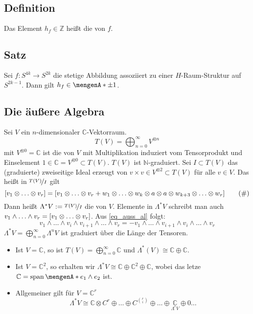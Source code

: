 \subsection{Definition} %
\label{sub:46}
Das Element $h_f \in \mathds{Z}$ heißt die  von $f$.

\subsection{Satz} %
\label{sub:47}
Sei $f\colon S^{4k} \to S^{2k}$ die stetige Abbildung assoziiert zu einer $H$-Raum-Struktur auf $S^{2k-1}$. Dann gilt $h_f \in \set{\pm 1}$.



\subsection*{Die äußere Algebra}
Sei $V$ ein $n$-dimensionaler $\mathds{C}$-Vektorraum.
\[
	T(V) = \bigoplus_{n=0}^\infty V^{\otimes n}
\]
mit $V^{\otimes 0}=\mathds{C}$ ist die  von $V$ mit Multiplikation induziert vom Tensorprodukt und Einselement 
$1\in \mathds{C}=V^{\otimes 0} \subset T(V)$. $T(V)$ ist $\mathds{N}$-graduiert. Sei $I \subset T(V)$ das (graduierte) zweiseitige Ideal erzeugt von 
$v \times v \in V^{\otimes 2} \subset T(V)$ für alle $v \in V$. Das heißt in $\nicefrac{T(V)}{I}$ gilt
\begin{equation*}
	\benbrace*{v_1 \otimes \ldots \otimes v_r} = \benbrace*{v_1 \otimes  \ldots \otimes v_r + w_1 \otimes  \ldots \otimes w_k \otimes a \otimes a \otimes w_{k+3} \otimes 
	\ldots \otimes w_r} \label{eq_auss_al} \tag{\#}
\end{equation*}
Dann heißt $\Lambda^* V:= \nicefrac{T(V)}{I}$ die  von $V$. Elemente in $\Lambda^*V$ schreibt man auch 
$v_1 \wedge \ldots \wedge v_r = \benbrace*{v_1 \otimes \ldots \otimes v_r}$. Aus \eqref{eq_auss_al} folgt: 
\[
	v_1 \wedge \ldots \wedge v_i \wedge v_{i+1} \wedge \ldots \wedge v_r = - v_1 \wedge \ldots \wedge v_{i+1} \wedge v_i \wedge \ldots \wedge v_r
\]
$\Lambda^* V = \bigoplus_{n=0}^\infty \Lambda^n V$ ist graduiert über die Länge der Tensoren.
\begin{beispiel}
\leavevmode
\begin{itemize}
	\item Ist $V=\mathds{C}$, so ist $T(V) = \bigoplus_{n=0}^\infty \mathds{C}$ und $\Lambda^*(V) \cong \mathds{C} \oplus \mathds{C}$.
	\item Ist $V=\mathds{C}^2$, so erhalten wir $\Lambda^* V \cong \mathds{C} \oplus \mathds{C}^2 \oplus \mathds{C}$, wobei das letze 
	$\mathds{C} = \Span \set{e_1 \wedge e_2} $ ist.
	\item Allgemeiner gilt für $V=\mathds{C}^r$
	\[
		\Lambda^* V \cong \mathds{C} \otimes C^r \oplus \ldots \oplus C^{\binom{r}{i}} \oplus \ldots \oplus \underset{\Lambda^r V}{\mathds{C}} \oplus 0 \ldots 
	\]
\end{itemize}
\end{beispiel}

